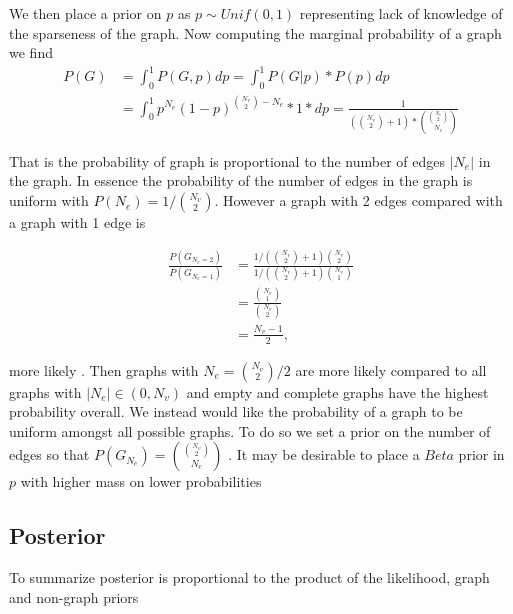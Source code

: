 \documentclass[11pt,a4paper]{article}
\numberwithin{equation}{section}
\begin{document}
We then place a prior on \(p\) as \(p \sim Unif(0,1)\) representing lack
of knowledge of the sparseness of the graph. Now computing the marginal
probability of a graph we find 
\[ \begin{aligned} P(G)  & = \int_0^1  P(G,p)dp   = \int_0^1 P(G|p)*P(p)dp \\ 
&= \int_0^1 p^{N_e}(1-p)^{\binom{N_v}{2}-N_e}*1*dp = \frac{1}{(\binom{N_v}{2}+1)* \binom{\binom{N_v}{2}}{N_e} }  \end{aligned}\]

That is the probability of graph is proportional to the number of edges
\(|N_e|\) in the graph. In essence the probability of the number of
edges in the graph is uniform with \(P(N_e) = 1/\binom{N_v}{2}\).
However a graph with 2 edges compared with a graph with 1 edge is

\[\begin{aligned}\frac{ P(G_{N_e = 2})}{P(G_{N_e = 1})}  &=  \frac{1/(\binom{N_v}{2}+1)\binom{N_v}{2}}{1/(\binom{N_v}{2}+1)\binom{N_v}{1}} \\& = \frac{\binom{N_v}{1}}{\binom{N_v}{2}}  \\& = \frac{N_v-1}{2},\end{aligned}\]

more likely   . Then graphs with \(N_e = \binom{N_v}{2}/2\) are more likely
compared to all graphs with \(|N_e| \in (0, N_v)\) and empty and
complete graphs have the highest probability overall. We instead would
like the probability of a graph to be uniform amongst all possible
graphs. To do so we set a prior on the number of edges so that
\(P(G_{N_e}) = \binom{\binom{N_v}{2}}{N_e}\) .  It may be desirable to
place a \(Beta\) prior in \(p\) with higher mass on lower probabilities 

\hypertarget{posterior}{%
\subsection{Posterior}\label{posterior}}

To summarize posterior is proportional to the product of the likelihood,
graph and non-graph priors
\end{document}
